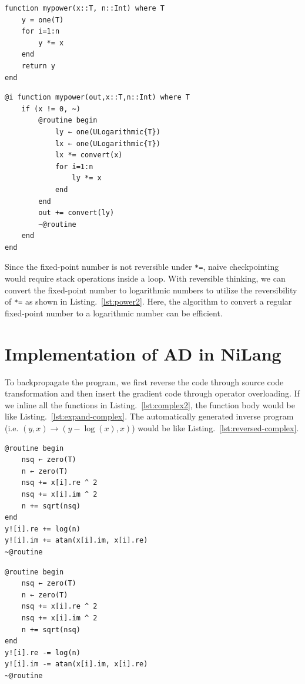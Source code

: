 \documentclass{article}
\newcommand{\<}{\langle}
\renewcommand{\>}{\rangle}
\renewcommand{\cite}[1]{{\citep{#1}}}
\newcommand{\Lst}[1]{Listing.~\ref{#1}}
\theoremstyle{definition}\newtheorem{definition}{\textit{Definition}}
\begin{document}
\begin{minipage}{.45\columnwidth}
\begin{lstlisting}[mathescape=true,caption={A regular power function.},label={lst:power1}]
function mypower(x::T, n::Int) where T
    y = one(T)
    for i=1:n
        y *= x
    end
    return y
end
\end{lstlisting}
\end{minipage}\hfill
\begin{minipage}{.45\columnwidth}
\begin{lstlisting}[mathescape=true,caption={A reversible power function.},label={lst:power2}]
@i function mypower(out,x::T,n::Int) where T
    if (x != 0, ~)
        @routine begin
            ly ← one(ULogarithmic{T})
            lx ← one(ULogarithmic{T})
            lx *= convert(x)
            for i=1:n
                ly *= x
            end
        end
        out += convert(ly)
        ~@routine
    end
end
\end{lstlisting}
\end{minipage}

Since the fixed-point number is not reversible under \texttt{*=}, naive checkpointing would require stack operations inside a loop. With reversible thinking, we can convert the fixed-point number to logarithmic numbers to utilize the reversibility of \texttt{*=} as shown in \Lst{lst:power2}. Here, the algorithm to convert a regular fixed-point number to a logarithmic number can be efficient.~\cite{Turner2010}

\section{Implementation of AD in NiLang}\label{app:jacobian}
To backpropagate the program, we first reverse the code through source code transformation and then insert the gradient code through operator overloading.
If we inline all the functions in \Lst{lst:complex2}, the function body would be like \Lst{lst:expand-complex}.
The automatically generated inverse program (i.e. $(y, x) \rightarrow (y-\log(x), x)$) would be like \Lst{lst:reversed-complex}.

\begin{minipage}{.45\textwidth}
\begin{lstlisting}[mathescape=true,caption={The inlined function body of \Lst{lst:complex2}.},label={lst:expand-complex}, frame=tlrb]
@routine begin
    nsq ← zero(T)
    n ← zero(T)
    nsq += x[i].re ^ 2
    nsq += x[i].im ^ 2
    n += sqrt(nsq)
end
y![i].re += log(n)
y![i].im += atan(x[i].im, x[i].re)
~@routine
\end{lstlisting}
\end{minipage}\hfill
\begin{minipage}{.45\textwidth}
    \begin{lstlisting}[mathescape=true,caption={The inverse of \Lst{lst:expand-complex}.},label={lst:reversed-complex}, frame=tlrb]
@routine begin
    nsq ← zero(T)
    n ← zero(T)
    nsq += x[i].re ^ 2
    nsq += x[i].im ^ 2
    n += sqrt(nsq)
end
y![i].re -= log(n)
y![i].im -= atan(x[i].im, x[i].re)
~@routine
\end{lstlisting}
\end{minipage}
\end{document}
